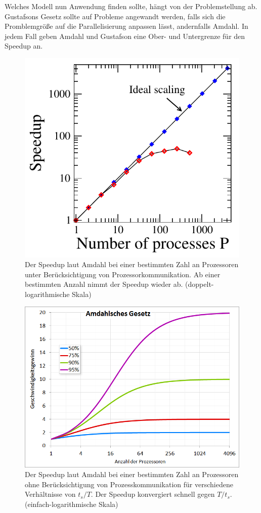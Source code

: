 		Welches Modell nun Anwendung finden sollte, hängt von der Problemstellung ab. Gustafsons Gesetz sollte auf Probleme angewandt werden, falls sich die Promblemgrö\ss e auf die Parallelisierung anpassen lässt, andernfalls Amdahl. In jedem Fall geben Amdahl und Gustafson eine Ober- und Untergrenze für den \Gls{Speedup} an. 
        
		\begin{figure}[h]
		\centering
    		\includegraphics[height=0.4\textwidth]{chapter1/pictures/Amdahl_praxis.png}
    		\caption[Speedup laut Amdahl mit Prozesskommunikation]{Der Speedup laut Amdahl bei einer bestimmten Zahl an Prozessoren unter Berücksichtigung von Prozessorkommunikation. Ab einer bestimmten Anzahl nimmt der Speedup wieder ab. (doppelt-logarithmische Skala) \autocite{carch}}
    		\label{1:am_prax}
		\end{figure}
        
		\newpage
		\begin{figure}[h]
		\centering
    		\includegraphics[height=0.5\textwidth]{chapter1/pictures/Amdahl.png}
    		\caption[Speedup laut Amdahl ohne Prozesskommunikation]{Der Speedup laut Amdahl bei einer bestimmten Zahl an Prozessoren ohne Berücksichtigung von Prozesskommunikation für verschiedene Verhältnisse von $t_s/T$. Der Speedup konvergiert schnell gegen $T/t_s$. (einfach-logarithmische Skala) \autocite{wikiAmdahl}}
    		\label{1:am}
		\end{figure}
		
